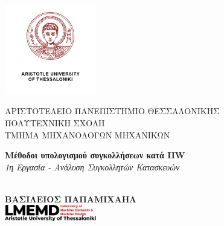 \newcommand{\uni}{ΑΡΙΣΤΟΤΕΛΕΙΟ ΠΑΝΕΠΙΣΤΗΜΙΟ ΘΕΣΣΑΛΟΝΙΚΗΣ}
\newcommand{\faculty}{ΠΟΛΥΤΕΧΝΙΚΗ ΣΧΟΛΗ}
\newcommand{\tmhma}{ΤΜΗΜΑ ΜΗΧΑΝΟΛΟΓΩΝ ΜΗΧΑΝΙΚΩΝ}


\newcommand{\titlos}{Μέθοδοι υπολογισμού συγκολλήσεων κατά IIW}
\newcommand{\ypotitlos}{1η Εργασία - Ανάλυση Συγκολλητών Κατασκευών}


\newcommand{\onomaauthor}{ΒΑΣΙΛΕΙΟΣ ΠΑΠΑΜΙΧΑΗΛ}


\newcommand{\advisor}{Γάκιας Χρήστος}
\newcommand{\mailauthor}{\href{mailto:vasilepi@meng.auth.gr}{vasilepi@meng.auth.gr}}
\newcommand{\aem}{6920}
\newcommand{\hmeromhnia}{\today}



\begin{titlepage}
    \begin{center}
    \includegraphics[width=4cm]{media/autheng.jpg}
     \end{center}
    
    \begin{center}
        \large
        \uni\\
        \normalsize
        \faculty\\
        \vspace{1em}
        \tmhma
    \end{center}

    \vspace{2cm}
    \begin{center}
        \Large
        \textbf{\titlos}\\
        \vspace{1em}
        \large
        \textit{\ypotitlos}
    \end{center}
    \begin{center}
        \\
    \vspace{7em}
    \Large
    \textcolor{BrickRed}{\textbf{\onomaauthor}}\\
    \vspace{3em}
    \includegraphics[width=0.3\textwidth]{media/newlogov3-cropped-content.png}
    \end{center}


\end{titlepage}
